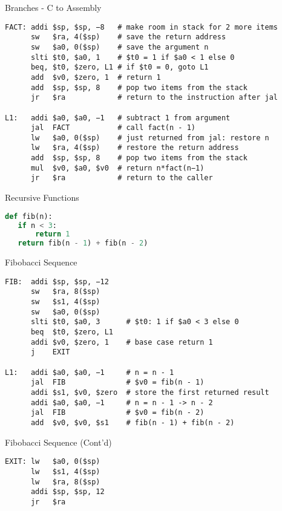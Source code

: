 \begin{frame}[fragile]{Branches - C to Assembly}
\begin{lstlisting}[keywords={addi, sw, add, slti, beq, mul, jr, jal, lw}, keywordstyle=\color{purple}\textbf]
FACT: addi $sp, $sp, −8   # make room in stack for 2 more items
      sw   $ra, 4($sp)    # save the return address
      sw   $a0, 0($sp)    # save the argument n
      slti $t0, $a0, 1    # $t0 = 1 if $a0 < 1 else 0
      beq, $t0, $zero, L1 # if $t0 = 0, goto L1
      add  $v0, $zero, 1  # return 1
      add  $sp, $sp, 8    # pop two items from the stack
      jr   $ra            # return to the instruction after jal
    
L1:   addi $a0, $a0, −1   # subtract 1 from argument
      jal  FACT           # call fact(n - 1)
      lw   $a0, 0($sp)    # just returned from jal: restore n
      lw   $ra, 4($sp)    # restore the return address
      add  $sp, $sp, 8    # pop two items from the stack
      mul  $v0, $a0, $v0  # return n*fact(n−1)
      jr   $ra            # return to the caller
\end{lstlisting}    
\end{frame}


\begin{frame}[fragile]{Recursive Functions}
\begin{lstlisting}[keywordstyle=\color{purple}\textbf, language=python]
def fib(n):
   if n < 3:
       return 1
   return fib(n - 1) + fib(n - 2)
\end{lstlisting}    
\end{frame}

\begin{frame}[fragile]{Fibobacci Sequence}
\begin{lstlisting}[keywordstyle=\color{purple}\textbf, numbers=none, keywords={addi, sw, slti, beq, j, jal, add}]
FIB:  addi $sp, $sp, −12
      sw   $ra, 8($sp)
      sw   $s1, 4($sp)
      sw   $a0, 0($sp)
      slti $t0, $a0, 3      # $t0: 1 if $a0 < 3 else 0
      beq  $t0, $zero, L1
      addi $v0, $zero, 1    # base case return 1
      j    EXIT

L1:   addi $a0, $a0, −1     # n = n - 1
      jal  FIB              # $v0 = fib(n - 1)
      addi $s1, $v0, $zero  # store the first returned result
      addi $a0, $a0, −1     # n = n - 1 -> n - 2 
      jal  FIB              # $v0 = fib(n - 2)
      add  $v0, $v0, $s1    # fib(n - 1) + fib(n - 2)
\end{lstlisting}    
\end{frame}

\begin{frame}[fragile]{Fibobacci Sequence (Cont'd)}
\begin{lstlisting}[keywordstyle=\color{purple}\textbf, numbers=none, keywords={lw, addi, jr}]
EXIT: lw   $a0, 0($sp)
      lw   $s1, 4($sp)
      lw   $ra, 8($sp)
      addi $sp, $sp, 12
      jr   $ra
\end{lstlisting}    
\end{frame}
